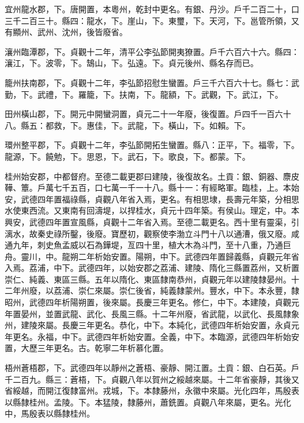 \begin{pinyinscope}
 宜州龍水郡，下。唐開置，本粵州，乾封中更名。有銀、丹沙。戶千二百二十，口三千二百三十。縣四：龍水，下。崖山，下。東璽，下。天河，下。邕管所領，又有顯州、武州、沈州，後皆廢省。



 瀼州臨潭郡，下。貞觀十二年，清平公李弘節開夷獠置。戶千六百六十六。縣四：瀼江，下。波零，下。鵠山，下。弘遠。下。貞元後州、縣名存而已。



 籠州扶南郡，下。貞觀十二年，李弘節招慰生蠻置。戶三千六百六十七。縣七：武勤，下。武禮，下。羅籠，下。扶南，下。龍額，下。武觀，下。武江，下。



 田州橫山郡，下。開元中開蠻洞置，貞元二十一年廢，後復置。戶四千一百六十八。縣五：都救，下。惠佳，下。武龍，下。橫山，下。如賴。下。



 環州整平郡，下。貞觀十二年，李弘節開拓生蠻置。縣八：正平，下。福零，下。龍源，下。饒勉，下。思恩，下。武石，下。歌良，下。都蒙。下。



 桂州始安郡，中都督府。至德二載更郡曰建陵，後復故名。土貢：銀、銅器、麖皮鞾、簟。戶萬七千五百，口七萬一千一十八。縣十一：有經略軍。臨桂，上。本始安，武德四年置福祿縣，貞觀八年省入焉，更名。有相思埭，長壽元年築，分相思水使東西流。又東南有回濤堤，以捍桂水，貞元十四年築。有侯山。理定，中。本興安，武德四年置宣風縣，貞觀十二年省入焉。至德二載更名。西十里有靈渠，引漓水，故秦史祿所鑿，後廢。寶歷初，觀察使李渤立斗門十八以通漕，俄又廢。咸通九年，刺史魚孟威以石為鏵堤，亙四十里，植大木為斗門，至十八重，乃通巨舟。靈川，中。龍朔二年析始安置。陽朔，中下。武德四年置歸義縣，貞觀元年省入焉。荔浦，中下。武德四年，以始安郡之荔浦、建陵、隋化三縣置荔州，又析置崇仁、純義、東區三縣。五年以隋化、東區隸南恭州，貞觀元年以建陵隸晏州。十二年州廢，以荔浦、崇仁來屬。崇仁後省，純義隸蒙州。豐水，中下。本永豐，隸昭州，武德四年析陽朔置，後來屬。長慶三年更名。修仁，中下。本建陵，貞觀元年置晏州，並置武龍、武化、長風三縣。十二年州廢，省武龍，以武化、長風隸象州，建陵來屬。長慶三年更名。恭化，中下。本純化，武德四年析始安置，永貞元年更名。永福，中下。武德四年析始安置。全義，中下。本臨源，武德四年析始安置，大歷三年更名。古。乾寧二年析慕化置。



 梧州蒼梧郡，下。武德四年以靜州之蒼梧、豪靜、開江置。土貢：銀、白石英。戶千二百九。縣三：蒼梧，下。貞觀八年以賀州之綏越來屬。十二年省豪靜，其後又省綏越，而開江復隸富州。戎城，下。本隸藤州，永徽中來屬。光化四年，馬殷表以縣隸桂州。孟陵。下。本猛陵，隸藤州，蕭銑置。貞觀八年來屬，更名。光化中，馬殷表以縣隸桂州。




\end{pinyinscope}
